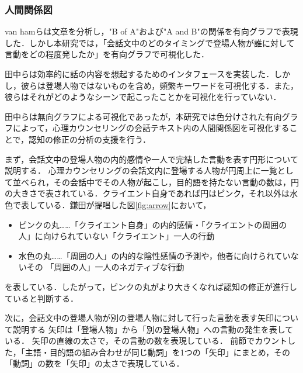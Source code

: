 \documentclass[shuuron]{kuee}
\begin{document}
\subsubsection{人間関係図}

van hamら\cite{van2009mapping}は文章を分析し，"B of A"および"A and B"の関係を有向グラフで表現した．しかし本研究では，「会話文中のどのタイミングで登場人物が誰に対して言動をどの程度発したか」を有向グラフで可視化した．

田中ら\cite{tanaka}は効率的に話の内容を想起するためのインタフェースを実装した．しかし，彼らは登場人物ではないものを含め，頻繁キーワードを可視化する．また，彼らはそれがどのようなシーンで起こったことかを可視化を行っていない．

田中らは無向グラフによる可視化であったが，本研究では色分けされた有向グラフによって，心理カウンセリングの会話テキスト内の人間関係図を可視化することで，認知の修正の分析の支援を行う．


まず，会話文中の登場人物の内的感情や一人で完結した言動を表す円形について説明する．
心理カウンセリングの会話文内に登場する人物が円周上に一覧として並べられ，その会話中でその人物が起こし，目的語を持たない言動の数は，円の大きさで表されている．クライエント自身であれば円はピンク，それ以外は水色で表している．鎌田\cite{鎌田穣2002臨床}が提唱した図\ref{fig:arrow}において，
\begin{itemize}
  \item ピンクの丸……「クライエント自身」の内的感情・「クライエントの周囲の人」に向けられていない「クライエント」一人の行動
  \item 水色の丸……「周囲の人」の内的な陰性感情の予測や，他者に向けられていないその
  「周囲の人」一人のネガティブな行動
\end{itemize}
を表している．したがって，ピンクの丸がより大きくなれば認知の修正が進行していると判断する．

次に，会話文中の登場人物が別の登場人物に対して行った言動を表す矢印について説明する
矢印は「登場人物」から「別の登場人物」への言動の発生を表している．
矢印の直線の太さで，その言動の数を表現している．
前節でカウントした，「主語・目的語の組み合わせが同じ動詞」を1つの「矢印」にまとめ，その「動詞」の数を「矢印」の太さで表現している．
\end{document}
